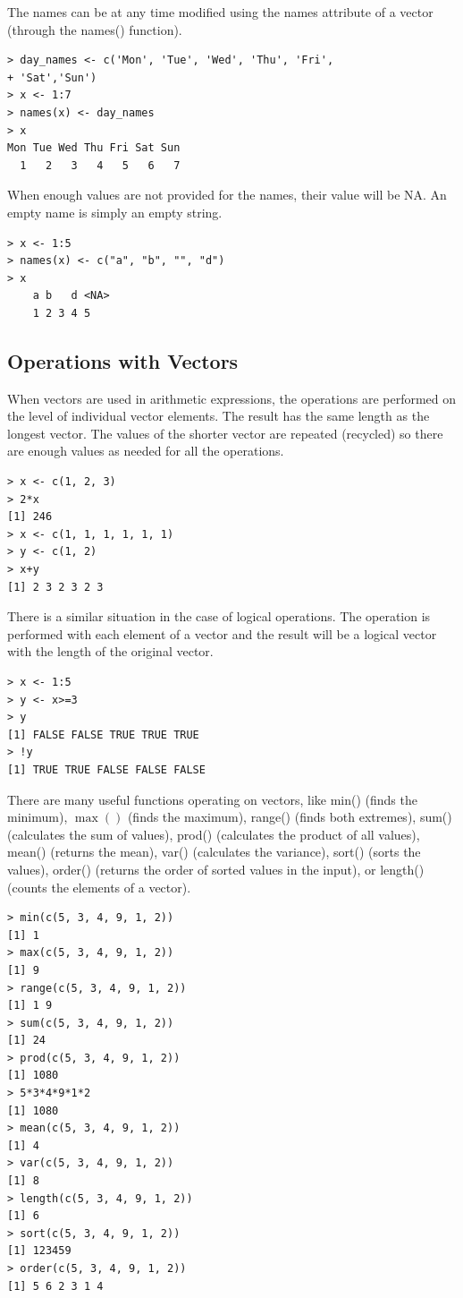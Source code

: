 \documentclass[11pt,openany,executivepaper]{book}
\begin{document}
The names can be at any time modified using the names attribute of a vector (through the names() function).

\begin{verbatim}
> day_names <- c('Mon', 'Tue', 'Wed', 'Thu', 'Fri',
+ 'Sat','Sun')
> x <- 1:7
> names(x) <- day_names
> x
Mon Tue Wed Thu Fri Sat Sun
  1   2   3   4   5   6   7
\end{verbatim}


When enough values are not provided for the names, their value will be NA. An empty name is simply an empty string.

\begin{verbatim}
> x <- 1:5
> names(x) <- c("a", "b", "", "d")
> x
    a b   d <NA>
    1 2 3 4 5
\end{verbatim}

\subsection{Operations with Vectors}
When vectors are used in arithmetic expressions, the operations are performed on the level of individual vector elements. The result has the same length as the longest vector. The values of the shorter vector are repeated (recycled) so there are enough values as needed for all the operations.

\begin{verbatim}
> x <- c(1, 2, 3)
> 2*x
[1] 246
> x <- c(1, 1, 1, 1, 1, 1)
> y <- c(1, 2)
> x+y
[1] 2 3 2 3 2 3
\end{verbatim}

There is a similar situation in the case of logical operations. The operation is performed with each element of a vector and the result will be a logical vector with the length of the original vector.

\begin{verbatim}
> x <- 1:5
> y <- x>=3
> y
[1] FALSE FALSE TRUE TRUE TRUE
> !y
[1] TRUE TRUE FALSE FALSE FALSE
\end{verbatim}

There are many useful functions operating on vectors, like min() (finds the minimum), $\max ()$ (finds the maximum), range() (finds both extremes), sum() (calculates the sum of values), prod() (calculates the product of all values), mean() (returns the mean), var() (calculates the variance), sort() (sorts the values), order() (returns the order of sorted values in the input), or length() (counts the elements of a vector).

\begin{verbatim}
> min(c(5, 3, 4, 9, 1, 2))
[1] 1
> max(c(5, 3, 4, 9, 1, 2))
[1] 9
> range(c(5, 3, 4, 9, 1, 2))
[1] 1 9
> sum(c(5, 3, 4, 9, 1, 2))
[1] 24
> prod(c(5, 3, 4, 9, 1, 2))
[1] 1080
> 5*3*4*9*1*2
[1] 1080
> mean(c(5, 3, 4, 9, 1, 2))
[1] 4
> var(c(5, 3, 4, 9, 1, 2))
[1] 8
> length(c(5, 3, 4, 9, 1, 2))
[1] 6
> sort(c(5, 3, 4, 9, 1, 2))
[1] 123459
> order(c(5, 3, 4, 9, 1, 2))
[1] 5 6 2 3 1 4
\end{verbatim}
\end{document}
